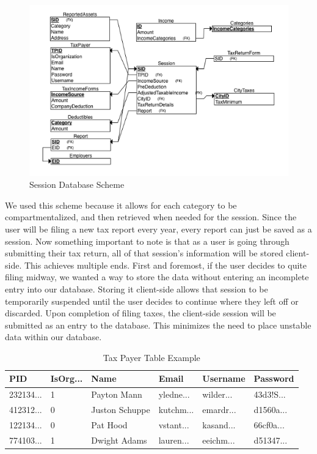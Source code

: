 \documentclass[sigconf]{acmart}
\begin{document}
\begin{figure}[H]
  \centering
  \includegraphics[width=\linewidth]{Images/DBSchema.png}
  \caption{Session Database Scheme}
  \label{DBSchema}
\end{figure}

We used this scheme because it allows for each category to be compartmentalized, and then retrieved when needed for the session. Since the user will be filing a new tax report every year, every report can just be saved as a session. Now something important to note is that as a user is going through submitting their tax return, all of that session's information will be stored client-side. This achieves multiple ends. First and foremost, if the user decides to quite filing midway, we wanted a way to store the data without entering an incomplete entry into our database. Storing it client-side allows that session to be temporarily suspended until the user decides to continue where they left off or discarded. Upon completion of filing taxes, the client-side session will be submitted as an entry to the database. This minimizes the need to place unstable data within our database.

\begin{table}[H]
\begin{center}
  \caption{Tax Payer Table Example}
\begin{tabularx}{0.45\textwidth} { | m{1cm} | m{.8cm} | m{1cm} | m{1cm} | m{1cm} | m{1cm} | }
 \hline
 PID & IsOrg... & Name & Email & Username & Password \\
 \hline
 \hline
 232134... & 1 & Payton Mann & yledne... & wilder... & 43d3!S...\\
 \hline
 412312... & 0 & Juston Schuppe & kutchm... & emardr... & d1560a...\\
 \hline
 122134... & 0 & Pat Hood & vstant... & kasand... & 66cf0a...\\
 \hline
 774103... & 1 & Dwight Adams & lauren... & eeichm... & d51347...\\
 \hline
\end{tabularx}
\end{center}
\end{table}
\end{document}
